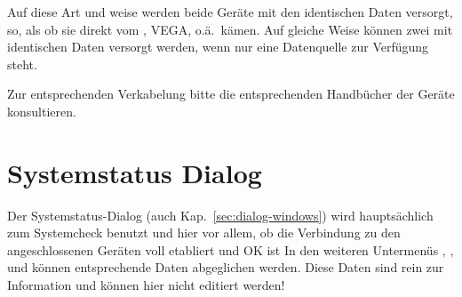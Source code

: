 %



Auf diese Art und weise werden beide Geräte mit den identischen Daten versorgt, so, als ob sie direkt vom \fl, VEGA, o.ä.\ kämen.
Auf gleiche Weise können zwei \al mit identischen Daten versorgt werden, wenn nur eine Datenquelle zur Verfügung steht.

Zur entsprechenden Verkabelung bitte die entsprechenden Handbücher der Geräte konsultieren.

\section{Systemstatus Dialog}\label{sec:system-status-dialog}

Der Systemstatus-Dialog (auch Kap.~\ref{sec:dialog-windows}) wird hauptsächlich zum Systemcheck benutzt und hier vor allem, ob die Verbindung zu den angeschlossenen Geräten voll etabliert und OK ist
 In den weiteren Untermenüs , ,  und  können entsprechende Daten abgeglichen werden. Diese Daten sind rein zur Information und können hier nicht editiert werden!

